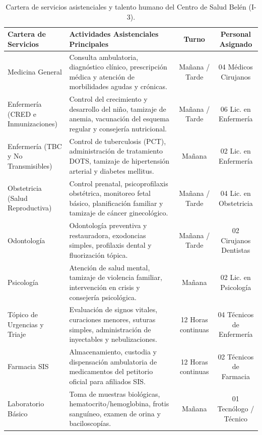 \begin{table}[H]
\centering
\small
\caption{Cartera de servicios asistenciales y talento humano del Centro de Salud Belén (I-3).}
\label{tab:cartera_servicios}
\vspace{0.2cm}
\begin{tabularx}{\textwidth}{p{3.8cm}Xcc}
\toprule
\textbf{Cartera de Servicios} & \textbf{Actividades Asistenciales Principales} & \textbf{Turno} & \textbf{Personal Asignado} \\
\midrule
Medicina General & Consulta ambulatoria, diagnóstico clínico, prescripción médica y atención de morbilidades agudas y crónicas. & Mañana / Tarde & 04 Médicos Cirujanos \\
\addlinespace
Enfermería (CRED e Inmunizaciones) & Control del crecimiento y desarrollo del niño, tamizaje de anemia, vacunación del esquema regular y consejería nutricional. & Mañana / Tarde & 06 Lic. en Enfermería \\
\addlinespace
Enfermería (TBC y No Transmisibles) & Control de tuberculosis (PCT), administración de tratamiento DOTS, tamizaje de hipertensión arterial y diabetes mellitus. & Mañana & 02 Lic. en Enfermería \\
\addlinespace
Obstetricia (Salud Reproductiva) & Control prenatal, psicoprofilaxis obstétrica, monitoreo fetal básico, planificación familiar y tamizaje de cáncer ginecológico. & Mañana / Tarde & 04 Lic. en Obstetricia \\
\addlinespace
Odontología & Odontología preventiva y restauradora, exodoncias simples, profilaxis dental y fluorización tópica. & Mañana / Tarde & 02 Cirujanos Dentistas \\
\addlinespace
Psicología & Atención de salud mental, tamizaje de violencia familiar, intervención en crisis y consejería psicológica. & Mañana & 02 Lic. en Psicología \\
\addlinespace
Tópico de Urgencias y Triaje & Evaluación de signos vitales, curaciones menores, suturas simples, administración de inyectables y nebulizaciones. & 12 Horas continuas & 04 Técnicos de Enfermería \\
\addlinespace
Farmacia SIS & Almacenamiento, custodia y dispensación ambulatoria de medicamentos del petitorio oficial para afiliados SIS. & 12 Horas continuas & 02 Técnicos de Farmacia \\
\addlinespace
Laboratorio Básico & Toma de muestras biológicas, hematocrito/hemoglobina, frotis sanguíneo, examen de orina y baciloscopías. & Mañana & 01 Tecnólogo / Técnico \\
\bottomrule
\end{tabularx}
\end{table}

